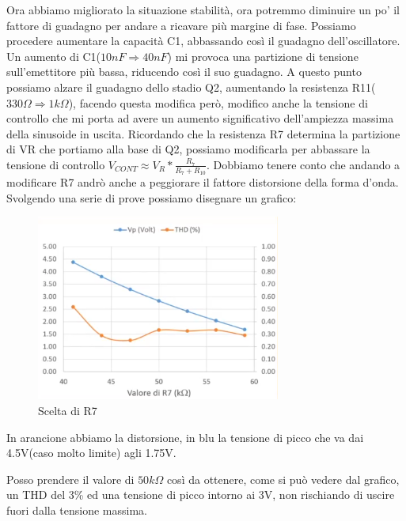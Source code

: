 \documentclass{article}
\begin{document}
Ora abbiamo migliorato la situazione stabilità, ora potremmo diminuire un po' il fattore di guadagno per andare a ricavare più margine di fase.
Possiamo procedere aumentare la capacità C1, abbassando così il guadagno dell'oscillatore.
Un aumento di C1($10nF\Rightarrow 40nF$) mi provoca una partizione di tensione sull'emettitore più bassa, riducendo così il suo guadagno.
A questo punto possiamo alzare il guadagno dello stadio Q2, aumentando la resistenza R11($330\Omega \Rightarrow 1k\Omega$), facendo questa modifica però, modifico anche la tensione di controllo che mi porta ad avere un aumento significativo dell'ampiezza massima della sinusoide in uscita.
Ricordando che la resistenza R7 determina la partizione di VR che portiamo alla base di Q2, possiamo modificarla per abbassare la tensione di controllo \Large$V_{CONT} \approx V_R*\frac{R_7}{R_7+R_10}$.\normalsize
Dobbiamo tenere conto che andando a modificare R7 andrò anche a peggiorare il fattore distorsione della forma d'onda.
Svolgendo una serie di prove possiamo disegnare un grafico:
~\begin{figure}[H]
\includegraphics[scale=1.2]{SceltaR7.png}
\centering
\caption{Scelta di R7}
\label{fig:foo}
\end{figure}
In arancione abbiamo la distorsione, in blu la tensione di picco che va dai 4.5V(caso molto limite) agli 1.75V.

Posso prendere il valore di $50k\Omega$ così da ottenere, come si può vedere dal grafico, un THD del 3\% ed una tensione di picco intorno ai 3V, non rischiando di uscire fuori dalla tensione massima. 
\end{document}
